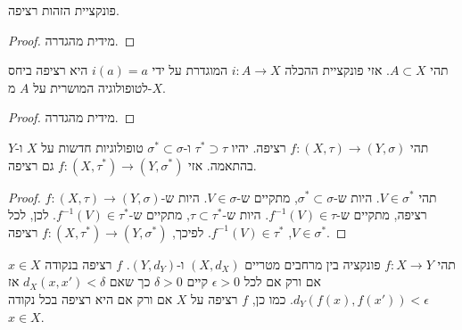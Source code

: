 \documentclass{tstextbook}
\begin{document}
\begin{proposition}
פונקציית הזהות רציפה.

\end{proposition}
\begin{proof}
מידית מהגדרה.

\end{proof}
\begin{proposition}
תהי \(A \subset X\). אזי פונקציית ההכלה \(i: A \to X\) המוגדרת על ידי \(i(a) = a\) היא רציפה ביחס לטופולוגיה המושרית על \(A\) מ-\(X\).

\end{proposition}
\begin{proof}
מידית מהגדרה.

\end{proof}
\begin{proposition}
תהי \(f: (X, \tau) \to (Y, \sigma)\) רציפה. יהיו \(\tau^* \supset \tau\) ו-\(\sigma^* \subset \sigma\) טופולוגיות חדשות על \(X\) ו-\(Y\) בהתאמה. אזי \(f: (X, \tau^*) \to (Y, \sigma^*)\) גם רציפה.

\end{proposition}
\begin{proof}
תהי \(V \in \sigma^*\). היות ש-\(\sigma^* \subset \sigma\), מתקיים ש-\(V \in \sigma\). היות ש-\(f: (X, \tau) \to (Y, \sigma)\) רציפה, מתקיים ש-\(f^{-1}(V) \in \tau\). היות ש-\(\tau \subset \tau^*\), מתקיים ש-\(f^{-1}(V) \in \tau^*\). לכן, לכל \(V \in \sigma^*\), \(f^{-1}(V) \in \tau^*\). לפיכך, \(f: (X, \tau^*) \to (Y, \sigma^*)\) רציפה.

\end{proof}
\begin{proposition}
תהי \(f: X \to Y\) פונקציה בין מרחבים מטריים \((X, d_X)\) ו-\((Y, d_Y)\). \(f\) רציפה בנקודה \(x \in X\) אם ורק אם לכל \(\epsilon > 0\) קיים \(\delta > 0\) כך שאם \(d_X(x, x') < \delta\) אז \(d_Y(f(x), f(x')) < \epsilon\). כמו כן, \(f\) רציפה על \(X\) אם ורק אם היא רציפה בכל נקודה \(x \in X\).

\end{proposition}
\end{document}
